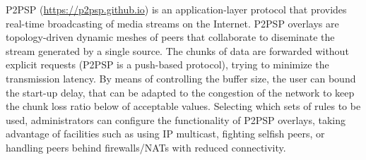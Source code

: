 

P2PSP (\url{https://p2psp.github.io}) is an application-layer protocol
that provides real-time broadcasting of media streams on the
Internet. P2PSP overlays are topology-driven dynamic meshes of peers
that collaborate to diseminate the stream generated by a single
source. The chunks of data are forwarded without explicit requests
(P2PSP is a push-based protocol), trying to minimize the transmission
latency. By means of controlling the buffer size, the user can bound
the start-up delay, that can be adapted to the congestion of the
network to keep the chunk loss ratio below of acceptable
values. Selecting which sets of rules to be used, administrators can
configure the functionality of P2PSP overlays, taking advantage of
facilities such as using IP multicast, fighting selfish peers, or
handling peers behind firewalls/NATs with reduced connectivity.

